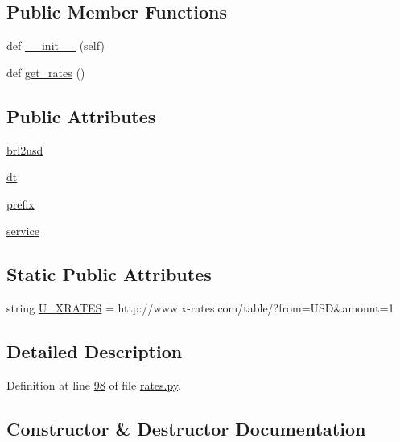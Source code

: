 \subsection*{Public Member Functions}
\begin{DoxyCompactItemize}
\item 
def \hyperlink{classrates_1_1_x_rates_a86fb4ba66a218c5f25b5b2c1f2a8345b}{\+\_\+\+\_\+init\+\_\+\+\_\+} (self)
\item 
def \hyperlink{classrates_1_1_x_rates_a034e274f1bf0a2509af2621eb27c7cce}{get\+\_\+rates} ()
\end{DoxyCompactItemize}
\subsection*{Public Attributes}
\begin{DoxyCompactItemize}
\item 
\hyperlink{classrates_1_1_x_rates_acb0a8b6ec059b823c8a46eb115341251}{brl2usd}
\item 
\hyperlink{classrates_1_1_x_rates_aa7835a0ac1d41af607d6d5885b49c131}{dt}
\item 
\hyperlink{classrates_1_1_x_rates_a3b92b41b0fbd77b44d01f094ff83dd9d}{prefix}
\item 
\hyperlink{classrates_1_1_x_rates_ad80e3c0295deaa15fac085324716747f}{service}
\end{DoxyCompactItemize}
\subsection*{Static Public Attributes}
\begin{DoxyCompactItemize}
\item 
string \hyperlink{classrates_1_1_x_rates_ab3bd64c08e6503f0d76c9f73dc38fa25}{U\+\_\+\+X\+R\+A\+T\+ES} = \textquotesingle{}http\+://www.\+x-\/rates.\+com/table/?from=U\+SD\&amount=1\textquotesingle{}
\end{DoxyCompactItemize}


\subsection{Detailed Description}


Definition at line \hyperlink{rates_8py_source_l00098}{98} of file \hyperlink{rates_8py_source}{rates.\+py}.



\subsection{Constructor \& Destructor Documentation}

